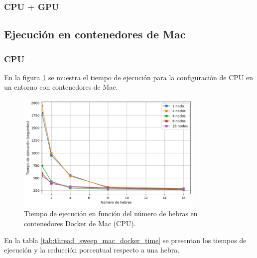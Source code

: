 \subsubsection{CPU + GPU}

\subsection{Ejecución en contenedores de Mac}
\subsubsection{CPU}

En la figura \ref{fig:thread_sweep_mac_docker_time} se muestra el tiempo de ejecución para la configuración de CPU en un entorno con contenedores de Mac.

\begin{figure}[H]
    \centering
    \includegraphics[width=0.8\textwidth]{imagenes/cap5/thread_sweep_mac_docker_time.png}
    \caption{Tiempo de ejecución en función del número de hebras en contenedores Docker de Mac (CPU).}
    \label{fig:thread_sweep_mac_docker_time}
\end{figure}

En la tabla \ref{tab:thread_sweep_mac_docker_time} se presentan los tiempos de ejecución y la reducción porcentual respecto a una hebra.

